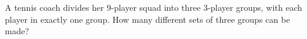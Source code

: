 A tennis coach divides her $9$-player squad into three $3$-player groups, with each player in exactly one group. How many different sets of three groups can be made?
